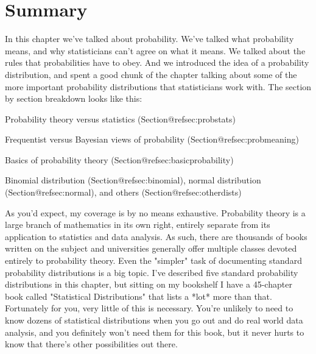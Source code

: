 \section{Summary}

In this chapter we've talked about probability. We've talked what probability means, and why statisticians can't agree on what it means. We talked about the rules that probabilities have to obey. And we introduced the idea of a probability distribution, and spent a good chunk of the chapter talking about some of the more important probability distributions that statisticians work with. The section by section breakdown looks like this:

 \itemsep -2pt
\item Probability theory versus statistics (Section@refsec:probstats)
\item Frequentist versus Bayesian views of probability (Section@refsec:probmeaning)
\item Basics of probability theory (Section@refsec:basicprobability)
\item Binomial distribution (Section@refsec:binomial), normal distribution (Section@refsec:normal), and others (Section@refsec:otherdists)


As you'd expect, my coverage is by no means exhaustive. Probability theory is a large branch of mathematics in its own right, entirely separate from its application to statistics and data analysis. As such, there are thousands of books written on the subject and universities generally offer multiple classes devoted entirely to probability theory. Even the "simpler" task of documenting standard probability distributions is a big topic. I've described five standard probability distributions in this chapter, but sitting on my bookshelf I have a 45-chapter book called "Statistical Distributions" \cite{Evans2000} that lists a *lot* more than that. Fortunately for you, very little of this is necessary. You're unlikely to need to know dozens of statistical distributions when you go out and do real world data analysis, and you definitely won't need them for this book, but it never hurts to know that there's other possibilities out there.

